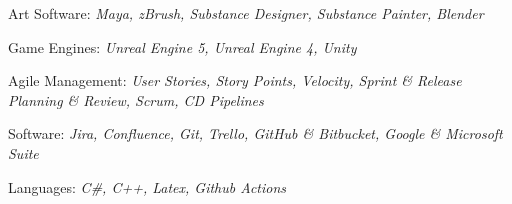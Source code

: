 


\begin{cvparagraph}
    \begin{cvitems}
        \text{}
        \item
        \item Art Software: \textit{Maya, zBrush, Substance Designer, Substance Painter, Blender}
        \item Game Engines: \textit{Unreal Engine 5, Unreal Engine 4, Unity}
        \item Agile Management: \textit{User Stories, Story Points, Velocity, Sprint \& Release Planning \& Review, Scrum, CD Pipelines}
        \item Software: \textit{Jira, Confluence, Git, Trello, GitHub \& Bitbucket, Google \& Microsoft Suite}
        \item Languages: \textit{C\#, C++, Latex, Github Actions}
    \end{cvitems}

\end{cvparagraph}